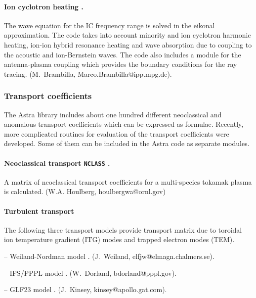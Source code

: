 \paragraph{Ion cyclotron heating \rm\cite{MB}.} 
The wave equation for the IC frequency range is solved in the eikonal
approximation. 
The code takes into account minority and ion cyclotron harmonic heating,
ion-ion hybrid resonance heating and wave absorption due to coupling to
the acoustic and ion-Bernstein waves. 
The code also includes a module for the antenna-plasma coupling which
provides the boundary conditions for the ray tracing. 
(M.~Brambilla, Marco.Brambilla@ipp.mpg.de).

\subsubsection{Transport coefficients}

The Astra library includes about one hundred different neoclassical
and anomalous transport coefficients which can be expressed as formulae. 
Recently, more complicated routines for evaluation of the transport
coefficients were developed. 
Some of them can be included in the Astra code as separate modules. 

\paragraph{Neoclassical transport {\tt NCLASS} \rm\cite{NCLASS}.}
A matrix of neoclassical transport coefficients for a multi-species
tokamak plasma is calculated.
(W.A. Houlberg, houlbergwa@ornl.gov)

\paragraph{Turbulent transport}
The following three transport models provide transport matrix due to
toroidal ion temperature gradient (ITG) modes and trapped electron modes
(TEM). 

-- { Weiland-Nordman model \rm\cite{WN}.}  
(J.~Weiland, elfjw@elmagn.chalmers.se). 

-- { IFS/PPPL model \rm\cite{ifspppl}.} (W.~Dorland,
bdorland@pppl.gov). 

-- { GLF23 model \rm\cite{glf}.} (J.~Kinsey,
kinsey@apollo.gat.com).


